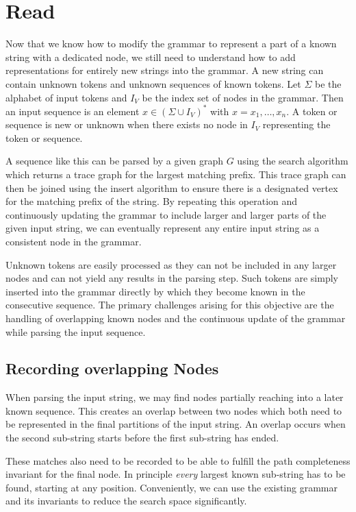 \section{Read}\label{sec:induction}
Now that we know how to modify the grammar to represent a part of a known string with a dedicated node, we still need to understand how to add representations for entirely new strings into the grammar. A new string can contain unknown tokens and unknown sequences of known tokens. Let $\Sigma$ be the alphabet of input tokens and $I_V$ be the index set of nodes in the grammar. Then an input sequence is an element $x \in {(\Sigma \cup I_V)}^*$ with $x = x_1, \ldots, x_n$. A token or sequence is new or unknown when there exists no node in $I_V$ representing the token or sequence.

\noindent
A sequence like this can be parsed by a given graph $G$ using the search algorithm which returns a trace graph for the largest matching prefix. This trace graph can then be joined using the insert algorithm to ensure there is a designated vertex for the matching prefix of the string. By repeating this operation and continuously updating the grammar to include larger and larger parts of the given input string, we can eventually represent any entire input string as a consistent node in the grammar.

\noindent
Unknown tokens are easily processed as they can not be included in any larger nodes and can not yield any results in the parsing step. Such tokens are simply inserted into the grammar directly by which they become known in the consecutive sequence.
The primary challenges arising for this objective are the handling of overlapping known nodes and the continuous update of the grammar while parsing the input sequence.

\subsection{Recording overlapping Nodes}

When parsing the input string, we may find nodes partially reaching into a later known sequence. This creates an overlap between two nodes which both need to be represented in the final partitions of the input string. An overlap occurs when the second sub-string starts before the first sub-string has ended. 

These matches also need to be recorded to be able to fulfill the path completeness invariant for the final node. In principle \textit{every} largest known sub-string has to be found, starting at any position. Conveniently, we can use the existing grammar and its invariants to reduce the search space significantly.

